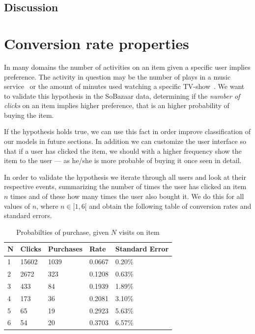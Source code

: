 \subsection{Discussion}



\clearpage
\section{Conversion rate properties}
\label{sec:conv-rate}

In many domains the number of activities on an item given a specific user
implies preference. The activity in question may be the number of plays in a
music service~\cite{parra2011walk} or the amount of minutes used watching a
specific TV-show~\cite{study-on-implicit-tv}. We want to validate this
hypothesis in the SoBazaar data, determining if the \textit{number of clicks}
on an item implies higher preference, that is an higher probability of buying
the item.



If the hypothesis holds true, we can use this fact in order improve
classification of our models in future sections. In addition we can customize
the user interface so that if a user has clicked the item, we should with a
higher frequency show the item to the user --- as he/she is more probable of
buying it once seen in detail.

In order to validate the hypothesis we iterate through all users and look at
their respective events, summarizing the number of times the user has clicked
an item $n$ times and of these how many times the user also bought it. We do
this for all values of $n$, where $n \in [1,6[$ and obtain the following table
of conversion rates and standard errors.

\begin{table}[H]
  \centering
  \begin{tabular}{lllll}
    \toprule
    N & Clicks & Purchases & Rate & Standard Error \\
    \midrule
    1 & 15602 & 1039  & 0.0667 & 0.20\% \\
    2 & 2672  & 323   & 0.1208 & 0.63\% \\
    3 & 433   & 84    & 0.1939 & 1.89\% \\
    4 & 173   & 36    & 0.2081 & 3.10\% \\
    5 & 65    & 19    & 0.2923 & 5.63\% \\
    6 & 54    & 20    & 0.3703 & 6.57\% \\
    \bottomrule
  \end{tabular}
  \label{tab:prob-purchase}
  \caption{Probabilties of purchase, given $N$ visits on item}
\end{table}

